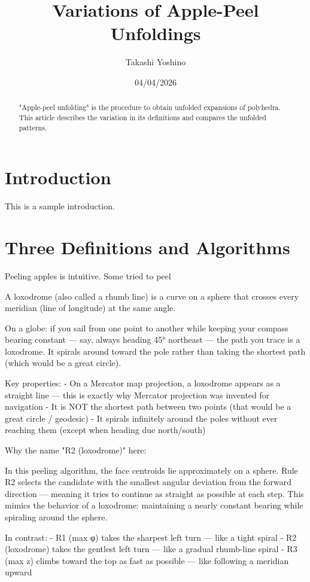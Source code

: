\documentclass[11pt]{article}
\title{Variations of Apple-Peel Unfoldings}
\author{Takashi Yoshino}
\date{04/04/2026}
\begin{document}
\maketitle

\begin{abstract}
"Apple-peel unfolding" is the procedure to obtain unfolded expansions of polyhedra. This article describes the variation in its definitions and compares the unfolded patterns. 
\end{abstract}

\section{Introduction}
This is a sample introduction.

\section{Three Definitions and Algorithms}
Peeling apples is intuitive. Some tried to peel 




A loxodrome (also called a rhumb line) is a curve on a sphere that crosses
  every meridian (line of longitude) at the same angle.

  On a globe: if you sail from one point to another while keeping your compass
  bearing constant — say, always heading 45° northeast — the path you trace is
  a loxodrome. It spirals around toward the pole rather than taking the
  shortest path (which would be a great circle).

  Key properties:
  - On a Mercator map projection, a loxodrome appears as a straight line — this
   is exactly why Mercator projection was invented for navigation
  - It is NOT the shortest path between two points (that would be a great
  circle / geodesic)
  - It spirals infinitely around the poles without ever reaching them (except
  when heading due north/south)


 Why the name "R2 (loxodrome)" here:

  In this peeling algorithm, the face centroids lie approximately on a sphere.
  Rule R2 selects the candidate with the smallest angular deviation from the
  forward direction — meaning it tries to continue as straight as possible at
  each step. This mimics the behavior of a loxodrome: maintaining a nearly
  constant bearing while spiraling around the sphere.

  In contrast:
  - R1 (max φ) takes the sharpest left turn — like a tight spiral
  - R2 (loxodrome) takes the gentlest left turn — like a gradual rhumb-line
  spiral
  - R3 (max z) climbs toward the top as fast as possible — like following a
  meridian upward
\end{document}
